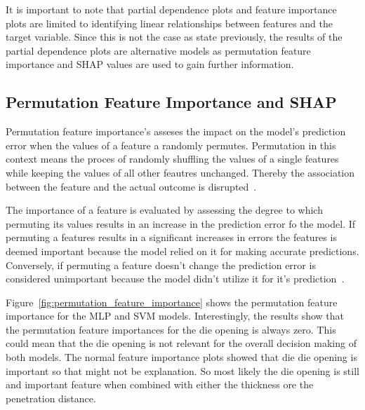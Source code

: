 It is important to note that partial dependence plots and feature importance plots are limited to
identifying linear relationships between features and the target variable.
Since this is not the case as state previously, the results of the partial dependence plots are
alternative models as permutation feature importance and SHAP values are used to gain further
information.

\subsection{Permutation Feature Importance and SHAP}\label{subsec:permutation-feature-importance-
and-shap}

Permutation feature importance's asseses the impact on the model's prediction error when the values
of a feature a randomly permutes. Permutation in this context means the proces of randomly
shuffling the values of a single features while keeping the values of all other feautres unchanged.
Thereby the association between the feature and the actual outcome is disrupted~\cite[p. 157]{
    molnar2020interpretable}.

The importance of a feature is evaluated by assessing the degree to which permuting its values
results in an increase in the prediction error fo the model.
If permuting a features results in a significant increases in errors the features is deemed
important because the model relied on it for making accurate predictions.
Conversely, if permuting a feature doesn't change the prediction error is considered unimportant
because the model didn't utilize it for it's prediction~\cite[p. 158]{molnar2020interpretable}.

Figure~\ref{fig:permutation_feature_importance} shows the permutation feature importance for the
\ac{MLP} and \ac{SVM} models.
Interestingly, the results show that the permutation feature importances for the die opening is
always zero.
This could mean that the die opening is not relevant for the overall decision making of both
models.
The normal feature importance plots showed that die die opening is important so that might not be
explanation.
So most likely the die opening is still and important feature when combined with either the
thickness ore the penetration distance.




